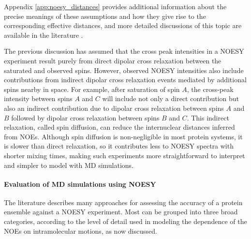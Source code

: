 \documentclass[9pt,review,pubversion]{livecoms}
\begin{document}
\noindent Appendix \ref{app:noesy_distances} provides additional information about the precise meanings of these assumptions and how they give rise to the corresponding effective distances, and more detailed discussions of this topic are available in the literature \cite{neuhaus_nuclear_2000,vogeli_nuclear_2014}.

The previous discussion has assumed that the cross peak intensities in a NOESY experiment result purely from direct dipolar cross relaxation between the saturated and observed spins.
However, observed NOESY intensities also include contributions from indirect dipolar cross relaxation events mediated by additional spins nearby in space.
For example, after saturation of spin $A$, the cross-peak intensity between spins $A$ and $C$ will include not only a direct contribution but also an indirect contribution due to dipolar cross relaxation between spins $A$ and $B$ followed by dipolar cross relaxation between spins $B$ and $C$.
This indirect relaxation, called spin diffusion, can reduce the internuclear distances inferred from NOEs. 
Although spin diffusion is non-negligible in most protein systems, it is slower than direct relaxation, so it contributes less to NOESY spectra with shorter mixing times, making such experiments more straightforward to interpret and simpler to model with MD simulations.

\paragraph{Evaluation of MD simulations using NOESY}

The literature describes many approaches for assessing the accuracy of a protein ensemble against a NOESY experiment.
Most can be grouped into three broad categories, according to the level of detail used in modeling the dependence of the NOEs on intramolecular motions, as now discussed.
\end{document}
